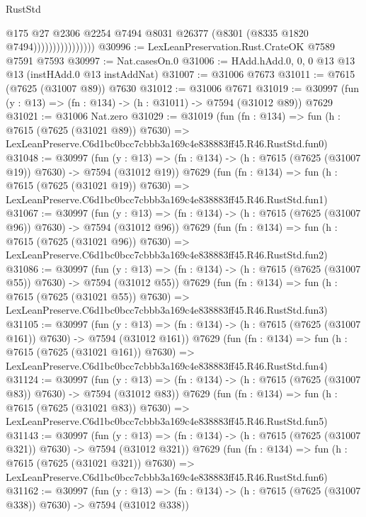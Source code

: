 \begin{lexlean}{RustStd}
\begin{coremodule}
                                @175
                                @27
                                @2306
                                @2254
                                @7494
                                @8031
                                @26377
                                (@8301 (@8335 @1820 @7494))))))))))))))))
@30996 := LexLeanPreservation.Rust.CrateOK @7589 @7591 @7593
@30997 := Nat.casesOn.{0}
@31006 := HAdd.hAdd.{0, 0, 0} @13 @13 @13 (instHAdd.{0} @13 instAddNat)
@31007 := @31006 @7673
@31011 := @7615 (@7625 (@31007 @89)) @7630
@31012 := @31006 @7671
@31019 := @30997 (fun (y : @13) => (fn : @134) -> (h : @31011) -> @7594 (@31012 @89)) @7629
@31021 := @31006 Nat.zero
@31029 := @31019
    (fun (fn : @134) =>
    fun (h : @7615 (@7625 (@31021 @89)) @7630) =>
    LexLeanPreserve.C6d1bc0bcc7cbbb3a169c4e838883ff45.R46.RustStd.fun0)
@31048 := @30997
    (fun (y : @13) => (fn : @134) -> (h : @7615 (@7625 (@31007 @19)) @7630) -> @7594 (@31012 @19))
    @7629
    (fun (fn : @134) =>
    fun (h : @7615 (@7625 (@31021 @19)) @7630) =>
    LexLeanPreserve.C6d1bc0bcc7cbbb3a169c4e838883ff45.R46.RustStd.fun1)
@31067 := @30997
    (fun (y : @13) => (fn : @134) -> (h : @7615 (@7625 (@31007 @96)) @7630) -> @7594 (@31012 @96))
    @7629
    (fun (fn : @134) =>
    fun (h : @7615 (@7625 (@31021 @96)) @7630) =>
    LexLeanPreserve.C6d1bc0bcc7cbbb3a169c4e838883ff45.R46.RustStd.fun2)
@31086 := @30997
    (fun (y : @13) => (fn : @134) -> (h : @7615 (@7625 (@31007 @55)) @7630) -> @7594 (@31012 @55))
    @7629
    (fun (fn : @134) =>
    fun (h : @7615 (@7625 (@31021 @55)) @7630) =>
    LexLeanPreserve.C6d1bc0bcc7cbbb3a169c4e838883ff45.R46.RustStd.fun3)
@31105 := @30997
    (fun (y : @13) => (fn : @134) -> (h : @7615 (@7625 (@31007 @161)) @7630) -> @7594 (@31012 @161))
    @7629
    (fun (fn : @134) =>
    fun (h : @7615 (@7625 (@31021 @161)) @7630) =>
    LexLeanPreserve.C6d1bc0bcc7cbbb3a169c4e838883ff45.R46.RustStd.fun4)
@31124 := @30997
    (fun (y : @13) => (fn : @134) -> (h : @7615 (@7625 (@31007 @83)) @7630) -> @7594 (@31012 @83))
    @7629
    (fun (fn : @134) =>
    fun (h : @7615 (@7625 (@31021 @83)) @7630) =>
    LexLeanPreserve.C6d1bc0bcc7cbbb3a169c4e838883ff45.R46.RustStd.fun5)
@31143 := @30997
    (fun (y : @13) => (fn : @134) -> (h : @7615 (@7625 (@31007 @321)) @7630) -> @7594 (@31012 @321))
    @7629
    (fun (fn : @134) =>
    fun (h : @7615 (@7625 (@31021 @321)) @7630) =>
    LexLeanPreserve.C6d1bc0bcc7cbbb3a169c4e838883ff45.R46.RustStd.fun6)
@31162 := @30997
    (fun (y : @13) => (fn : @134) -> (h : @7615 (@7625 (@31007 @338)) @7630) -> @7594 (@31012 @338))

\end{coremodule}
\end{lexlean}
